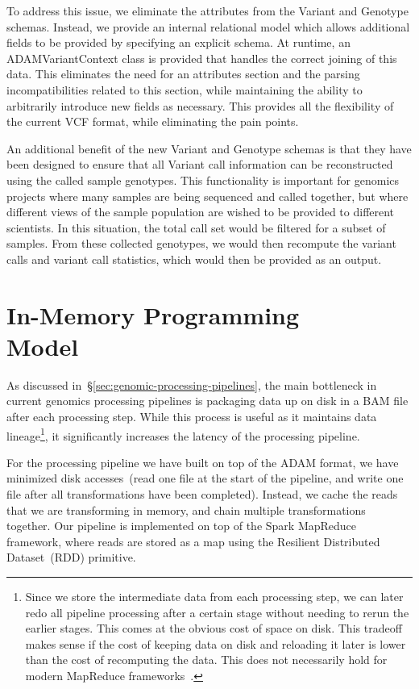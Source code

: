 \documentclass[10pt,twocolumn]{article}
\theoremstyle{plain}
\begin{document}
To address this issue, we eliminate the attributes from the Variant and Genotype schemas. Instead, we provide an internal relational model
which allows additional fields to be provided by specifying an explicit schema. At runtime, an ADAMVariantContext class is provided that
handles the correct joining of this data. This eliminates the need for an attributes section and the parsing incompatibilities related to this section,
while maintaining the ability to arbitrarily introduce new fields as necessary. This provides all the flexibility of the current VCF format, while eliminating
the pain points.

An additional benefit of the new Variant and Genotype schemas is that they have been designed to ensure that all Variant call information
can be reconstructed using the called sample genotypes. This functionality is important for genomics projects where many samples are being
sequenced and called together, but where different views of the sample population are wished to be provided to different scientists. In this situation,
the total call set would be filtered for a subset of samples. From these collected genotypes, we would then recompute the variant calls and variant
call statistics, which would then be provided as an output.

\section{In-Memory Programming\\Model}
\label{sec:in-memory-programming-model}

As discussed in~\S\ref{sec:genomic-processing-pipelines}, the main bottleneck in current genomics processing pipelines is
packaging data up on disk in a BAM file after each processing step. While this process is useful as it maintains data
lineage\footnote{Since we store the intermediate data from each processing step, we can later redo all pipeline processing
after a certain stage without needing to rerun the earlier stages. This comes at the obvious cost of space on disk. This tradeoff
makes sense if the cost of keeping data on disk and reloading it later is lower than the cost of recomputing the data. This
does not necessarily hold for modern MapReduce frameworks~\cite{zaharia12}.}, it significantly increases the latency of the
processing pipeline.

For the processing pipeline we have built on top of the ADAM format, we have minimized disk accesses~(read one file at the
start of the pipeline, and write one file after all transformations have been completed). Instead, we cache the reads that we are
transforming in memory, and chain multiple transformations together. Our pipeline is implemented on top of the Spark MapReduce
framework, where reads are stored as a map using the Resilient Distributed Dataset~(RDD) primitive.
\end{document}
